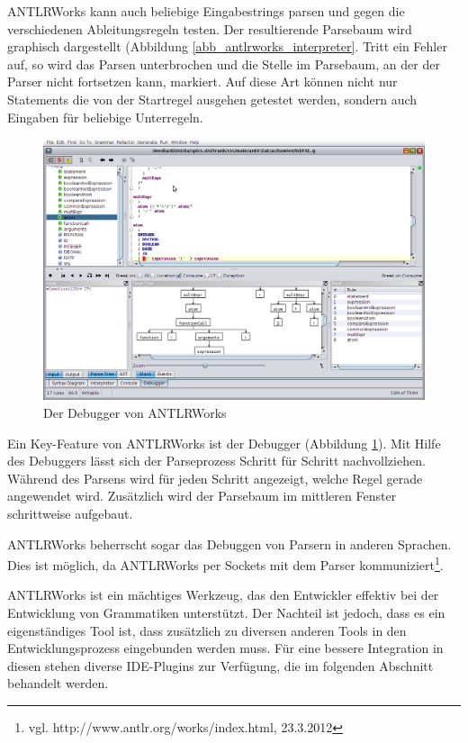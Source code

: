 ANTLRWorks kann auch beliebige Eingabestrings parsen und gegen die verschiedenen Ab\-lei\-tungs\-re\-geln testen. Der resultierende Parsebaum wird graphisch dargestellt (Abbildung \ref{abb_antlrworks_interpreter}. Tritt ein Fehler auf, so wird das Parsen unterbrochen und die Stelle im Parsebaum, an der der Parser nicht fortsetzen kann, markiert. Auf diese Art können nicht nur Statements die von der Startregel ausgehen getestet werden, sondern auch Eingaben für beliebige Unterregeln.


\begin{figure}[h]
\includegraphics[scale=0.35]{figures/antlrworks_debugger}
\caption{Der Debugger von ANTLRWorks}
\label{abb_antlrworks_debugger}
\end{figure}

Ein Key-Feature von ANTLRWorks ist der Debugger (Abbildung \ref{abb_antlrworks_debugger}). Mit Hilfe des Debuggers lässt sich der Parseprozess Schritt für Schritt nachvollziehen. Während des Parsens wird für jeden Schritt angezeigt, welche Regel gerade angewendet wird. Zu\-sätz\-lich wird der Parsebaum im mittleren Fenster schrittweise aufgebaut.

ANTLRWorks beherrscht sogar das Debuggen von Parsern in anderen Spra\-chen. Dies ist möglich, da ANTLRWorks per Sockets mit dem Parser kommuniziert\footnote{ vgl. http://www.antlr.org/works/index.html, 23.3.2012}.


ANTLRWorks ist ein mächtiges Werkzeug, das den Entwickler effektiv bei der Entwicklung von Grammatiken unterstützt. Der Nachteil ist jedoch, dass es ein eigenständiges Tool ist, dass zusätzlich zu diversen anderen Tools in den Entwicklungsprozess eingebunden werden muss. Für eine bessere Integration in diesen stehen diverse IDE-Plugins zur Verfügung, die im folgenden Abschnitt behandelt werden.
 
